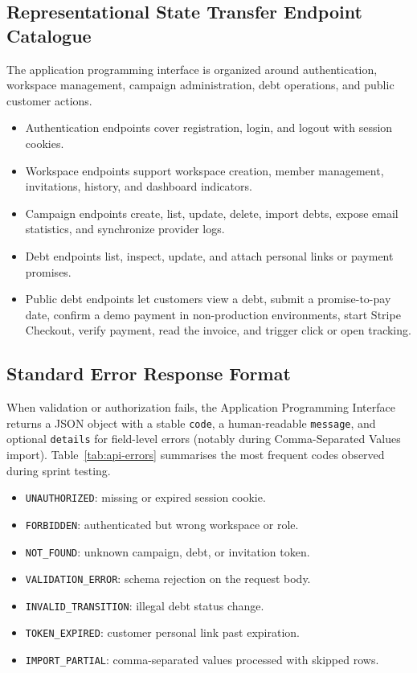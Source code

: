 ﻿\documentclass[12pt,a4paper]{report}
\begin{document}
\subsection{Representational State Transfer Endpoint Catalogue}

\noindent The application programming interface is organized around authentication, workspace management, campaign administration, debt operations, and public customer actions.

\begin{itemize}
  \item Authentication endpoints cover registration, login, and logout with session cookies.
  \item Workspace endpoints support workspace creation, member management, invitations, history, and dashboard indicators.
  \item Campaign endpoints create, list, update, delete, import debts, expose email statistics, and synchronize provider logs.
  \item Debt endpoints list, inspect, update, and attach personal links or payment promises.
  \item Public debt endpoints let customers view a debt, submit a promise-to-pay date, confirm a demo payment in non-production environments, start Stripe Checkout, verify payment, read the invoice, and trigger click or open tracking.
\end{itemize}


\subsection{Standard Error Response Format}

When validation or authorization fails, the Application Programming Interface returns a
JSON object with a stable \texttt{code}, a human-readable \texttt{message}, and optional
\texttt{details} for field-level errors (notably during Comma-Separated Values import).
Table~\ref{tab:api-errors} summarises the most frequent codes observed during sprint testing.

\begin{itemize}
  \item \texttt{UNAUTHORIZED}: missing or expired session cookie.
  \item \texttt{FORBIDDEN}: authenticated but wrong workspace or role.
  \item \texttt{NOT\_FOUND}: unknown campaign, debt, or invitation token.
  \item \texttt{VALIDATION\_ERROR}: schema rejection on the request body.
  \item \texttt{INVALID\_TRANSITION}: illegal debt status change.
  \item \texttt{TOKEN\_EXPIRED}: customer personal link past expiration.
  \item \texttt{IMPORT\_PARTIAL}: comma-separated values processed with skipped rows.
\end{itemize}
\end{document}
